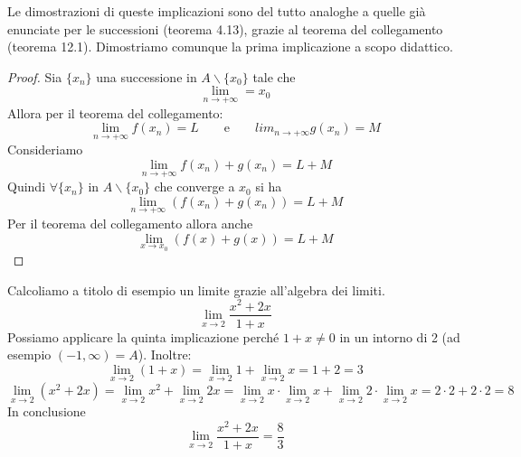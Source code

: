Le dimostrazioni di queste implicazioni sono del tutto analoghe a quelle già enunciate per le successioni (teorema 4.13), grazie al teorema del collegamento (teorema 12.1). Dimostriamo comunque la prima implicazione a scopo didattico.

\begin{proof}
Sia $\{x_n\}$ una successione in $A\backslash\{x_0\}$ tale che
\begin{equation*}
\lim_{n \to +\infty} = x_0
\end{equation*}
Allora per il teorema del collegamento:
\begin{equation*}
\lim_{n \to +\infty} f(x_n) = L \qquad \text{e} \qquad lim_{n \to +\infty} g(x_n) = M
\end{equation*}
Consideriamo
\begin{equation*}
\lim_{n \to +\infty} f(x_n) + g(x_n) = L + M
\end{equation*}
Quindi $\forall \{x_n\}$ in $A\backslash\{x_0\}$ che converge a $x_0$ si ha
\begin{equation*}
\lim_{n \to +\infty} (f(x_n) + g(x_n)) = L + M
\end{equation*}
Per il teorema del collegamento allora anche
\begin{equation*}
\lim_{x \to x_0} (f(x) + g(x)) = L + M
\end{equation*}
\end{proof}

\begin{example}
Calcoliamo a titolo di esempio un limite grazie all'algebra dei limiti.
\begin{equation*}
\lim_{x \to 2} \frac{x^2+2x}{1+x}
\end{equation*}
Possiamo applicare la quinta implicazione perché $1 + x \neq 0$ in un intorno di 2 (ad esempio $(-1, \infty) = A$). Inoltre:
\begin{equation*}
\lim_{x \to 2} (1+x) = \lim_{x \to 2} 1 + \lim_{x \to 2} x = 1 + 2 = 3
\end{equation*}
\begin{equation*}
\lim_{x \to 2} (x^2+2x) = \lim_{x \to 2} x^2 + \lim_{x \to 2} 2x = \lim_{x \to 2} x \cdot \lim_{x \to 2} x + \lim_{x \to 2} 2 \cdot \lim_{x \to 2} x = 2 \cdot 2 + 2 \cdot 2 = 8
\end{equation*}
In conclusione
\begin{equation*}
\lim_{x \to 2} \frac{x^2+2x}{1+x} = \frac{8}{3}
\end{equation*}
\end{example}